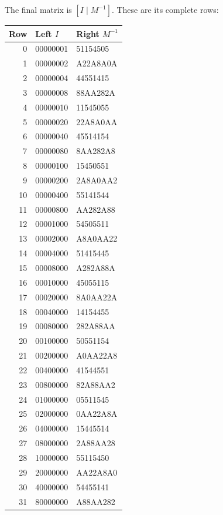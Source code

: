 \endgroup
The final matrix is $[I\mid M^{-1}]$. These are its complete rows:
\begingroup\small
\begin{longtable}{rll}
\toprule
Row & Left $I$ & Right $M^{-1}$\\\midrule
\endhead
0 & 00000001 & 51154505\\
1 & 00000002 & A22A8A0A\\
2 & 00000004 & 44551415\\
3 & 00000008 & 88AA282A\\
4 & 00000010 & 11545055\\
5 & 00000020 & 22A8A0AA\\
6 & 00000040 & 45514154\\
7 & 00000080 & 8AA282A8\\
8 & 00000100 & 15450551\\
9 & 00000200 & 2A8A0AA2\\
10 & 00000400 & 55141544\\
11 & 00000800 & AA282A88\\
12 & 00001000 & 54505511\\
13 & 00002000 & A8A0AA22\\
14 & 00004000 & 51415445\\
15 & 00008000 & A282A88A\\
16 & 00010000 & 45055115\\
17 & 00020000 & 8A0AA22A\\
18 & 00040000 & 14154455\\
19 & 00080000 & 282A88AA\\
20 & 00100000 & 50551154\\
21 & 00200000 & A0AA22A8\\
22 & 00400000 & 41544551\\
23 & 00800000 & 82A88AA2\\
24 & 01000000 & 05511545\\
25 & 02000000 & 0AA22A8A\\
26 & 04000000 & 15445514\\
27 & 08000000 & 2A88AA28\\
28 & 10000000 & 55115450\\
29 & 20000000 & AA22A8A0\\
30 & 40000000 & 54455141\\
31 & 80000000 & A88AA282\\
\bottomrule\end{longtable}
\endgroup
